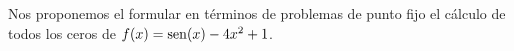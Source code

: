 
\begin{example}
  Nos proponemos el formular en términos de problemas de punto fijo el
  cálculo de todos los ceros de $f(x)=\operatorname{sen}(x)-4x^2+1$.



\end{example}
